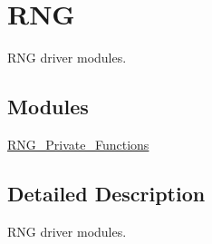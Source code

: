 \hypertarget{group___r_n_g}{\section{R\-N\-G}
\label{group___r_n_g}
}


R\-N\-G driver modules.  


\subsection*{Modules}
\begin{DoxyCompactItemize}
\item 
\hyperlink{group___r_n_g___private___functions}{R\-N\-G\-\_\-\-Private\-\_\-\-Functions}
\end{DoxyCompactItemize}


\subsection{Detailed Description}
R\-N\-G driver modules. 